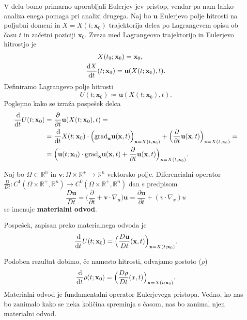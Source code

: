 \documentclass[mat2, tisk]{fmfdelo}
\newcommand{\R}{\mathbb R}
\newcommand{\bd}{\textbf}
\begin{document}
V delu bomo primarno uporabljali Eulerjev-jev pristop, vendar pa nam lahko analiza enega pomaga
pri analizi drugega. Naj bo $\bd{u}$ Eulerjevo polje hitrosti na poljubni domeni in $X = X(t; \bd{x}_0)$ trajektorija delca 
po Lagrangevem opisu ob času $t$ in začetni poziciji $\bd{x}_0$. 
Zveza med Lagrangeovo trajektorijo in Eulerjevo hitrostjo je 
\begin{align}
&X(t_0; \bd{x}_0) = \bd{x}_0, \\
\label{eq:euler-lagrange}
\frac{\dif X}{\dif t}&(t; \bd{x}_0) = \bd{u}(X(t; \bd{x}_0), t).
\end{align}
Definiramo Lagrangevo polje hitrosti
\begin{equation}
U(t; \bd{x}_0) \coloneqq \bd{u}(X(t; \bd{x}_0), t).
\end{equation}
Poglejmo kako se izraža pospešek delca
\begin{align*}
\frac{\dif}{\dif t} U(t; \bd{x}_0) &= \frac{\partial}{\partial t} \bd{u}(X(t; \bd{x}_0), t) = \\
&= \frac{\dif}{\dif t} X(t; \bd{x}_0) \cdot \Big(\text{grad}_\bd{x} \bd{u}(\bd{x}, t) \Big)_{\bd{x} = X(t, \bd{x}_0)} + \Big(\frac{\partial}{\partial t} \bd{u}(\bd{x}, t) \Big)_{\bd{x} = X(t, \bd{x}_0)} = \\
&= \Big(\bd{u}(t; \bd{x}_0) \cdot \text{grad}_\bd{x} \bd{u}(\bd{x}, t) + \frac{\partial}{\partial t} \bd{u}(\bd{x}, t) \Big)_{\bd{x} = X(t, \bd{x}_0)}.
\end{align*}

\newpage
\begin{definicija}
Naj bo $\Omega \subset \R^n$ in $\bd{v}: \Omega\times \R^+ \rightarrow \R^n$ vektorsko polje. Diferencialni operator 
$\frac{D}{D t}: C^1(\Omega \times \R^+, \R^n) \rightarrow C^0(\Omega \times \R^+, \R^n)$ dan s predpisom
\begin{equation}
\frac{D \bd{u}}{Dt} = \Big(\frac{\partial}{\partial t} + \bd{v} \cdot \nabla_\bd{x}\Big) \bd{u} = \frac{\partial \bd{u}}{\partial t} + (v\cdot \nabla_x) u
\end{equation}
se imenuje \textbf{materialni odvod}.
\end{definicija}

Pospešek, zapisan preko materialnega odvoda je 
\begin{equation}
\frac{\dif}{\dif t} U(t; \bd{x}_0) = \Big(\frac{D \bd{u}}{Dt}(\bd{x}, t) \Big)_{\bd{x} = X(t; \bd{x}_0)}.
\end{equation}

Podoben rezultat dobimo, če namesto hitrosti, odvajamo gostoto ($\rho$)
\begin{equation}
\frac{\dif }{\dif t} \rho(t; \bd{x}_0) = \Big(\frac{D \rho}{Dt}(x, t) \Big)_{\bd{x} = X(t; \bd{x}_0)}.
\end{equation}
Materialni odvod je fundamentalni operator Eulerjevega pristopa. Vedno, ko nas bo 
zanimalo kako se neka količina spreminja s časom, nas bo zanimal njen materialni odvod.
\end{document}
